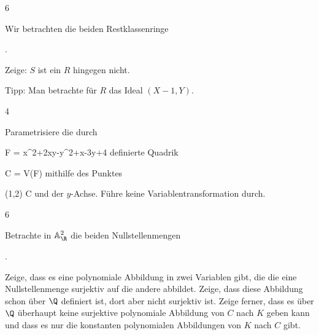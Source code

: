 {6}
{





Wir betrachten die beiden Restklassenringe

 { . }

Zeige: $S$ ist ein
$R$ hingegen nicht.





}
{ {} {} } {Tipp: Man betrachte für $R$ das Ideal $(X-1,Y)$.}



{4}
{





Parametrisiere die durch

\mavergleichskettedisp
{\vergleichskette
{F
}
{ =} { x^2+2xy-y^2+x-3y+4
}
{ } {
}
{ } {
}
{ } {
}
}
{}{}{}
definierte Quadrik

\mavergleichskette
{\vergleichskette
{ C
}
{ = }{ V(F)
}
{  }{
}
{    }{
}
{   }{
}
}
{}{}{}
mithilfe des Punktes

\mavergleichskette
{\vergleichskette
{ (1,2)
}
{ \in }{ C
}
{  }{
}
{    }{
}
{   }{
}
}
{}{}{}
und der $y$-Achse. Führe keine Variablentransformation durch.





}
{} {}

{6}
{





Betrachte in ${\mathbb A}^{2}_{ \R }$ die beiden Nullstellenmengen

 { . }

Zeige, dass es eine polynomiale Abbildung in zwei Variablen gibt, die die eine Nullstellenmenge surjektiv auf die andere abbildet. Zeige, dass diese Abbildung schon über $\Q$ definiert ist, dort aber nicht surjektiv ist. Zeige ferner, dass es über $\Q$ überhaupt keine surjektive polynomiale Abbildung von $C$ nach $K$ geben kann und dass es nur die konstanten polynomialen Abbildungen von $K$ nach $C$ gibt.





}
{} {}

